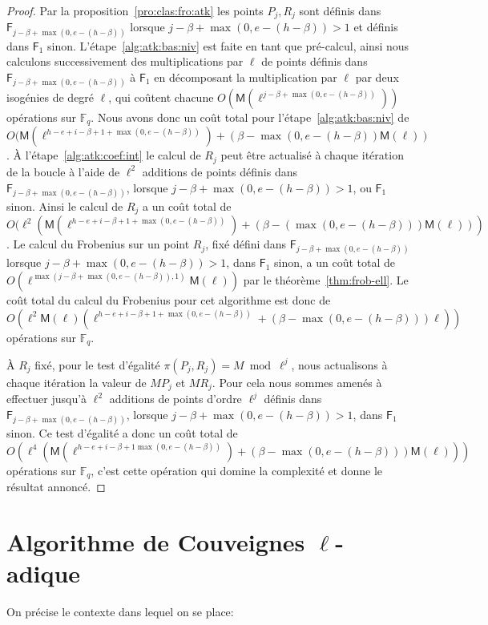 \documentclass[10pt,a4paper]{book}
\theoremstyle{plain}
\theoremstyle{definition}
\theoremstyle{definition}
\theoremstyle{definition}
\theoremstyle{definition}
\theoremstyle{definition}
\theoremstyle{remark}
\theoremstyle{remark}
\theoremstyle{definition}
\begin{document}
\begin{proof}
\sloppy
Par la proposition~\ref{pro:clas:fro:atk} les points $P_j,R_j$ sont définis
dans $\mathsf{F}_{j-\beta+\max(0,e-(h-\beta))}$ lorsque $j-\beta+\max(0,e-(h-\beta))>1$ et 
définis dans $\mathsf{F}_1$ sinon. L'étape~\ref{alg:atk:bas:niv} est faite en 
tant que pré-calcul, ainsi nous calculons successivement des multiplications par 
$\ell$ de points définis dans $\mathsf{F}_{j-\beta+\max(0,e-(h-\beta))}$ à 
$\mathsf{F}_{1}$ en décomposant la multiplication par $\ell$ par deux isogénies
de degré $\ell$, qui coûtent chacune $O(\mathsf{M}(\ell^{j-\beta+\max(0,e-
(h-\beta))}))$ opérations sur $\mathbb{F}_q$. Nous avons donc un coût total pour 
l'étape~\ref{alg:atk:bas:niv} de $O(\mathsf{M}(\ell^{h-e+i-\beta+1+\max(0,e-
(h-\beta))})+(\beta-\max(0,e-(h-\beta))\mathsf{M}(\ell))$.
\`A l'étape~\ref{alg:atk:coef:int} le calcul de $R_j$ peut être actualisé à 
chaque itération de la boucle à l'aide 
de $\ell^2$ additions de points définis dans $\mathsf{F}_{j-\beta+\max(0,e-(h-\beta))}$, 
lorsque $j-\beta+\max(0,e-(h-\beta))>1$, ou $\mathsf{F}_1$ sinon. Ainsi le calcul de $R_j$ a 
un coût total de 
$O(\ell^{2}(\mathsf{M}(\ell^{h-e+i-\beta+1+\max(0,e-(h-\beta))})+(\beta-(\max(0,e-(h-\beta)))\mathsf{M}(\ell)))$. 
Le calcul du Frobenius sur un point $R_j$, fixé défini dans 
$\mathsf{F}_{j-\beta+\max(0,e-(h-\beta))}$ lorsque $j-\beta+\max(0,e-(h-\beta))>1$, 
dans $\mathsf{F}_1$ sinon, a un coût total de $O(\ell^{\max(j-\beta+\max(0,e-(h-\beta)),1)}
\mathsf{M}(\ell))$ par le théorème~\ref{thm:frob-ell}. Le coût total du calcul du 
Frobenius pour cet algorithme est donc de 
\[O(\ell^2\mathsf{M}(\ell)(\ell^{h-e+i-\beta+1+\max(0,e-(h-\beta))}+(\beta-\max(0,e-(h-\beta)))\ell))\]
opérations sur $\mathbb{F}_q$.
\fussy

\`A $R_j$ fixé, pour le test d'égalité $\pi(P_j,R_j)= M \bmod \ell^j$, nous 
actualisons à chaque itération la valeur de $MP_j$ et $MR_j$. Pour cela nous 
sommes amenés à effectuer jusqu'à $\ell^2$ additions de points d'ordre 
$\ell^{j}$ définis dans $\mathsf{F}_{j-\beta+\max(0,e-(h-\beta))}$, lorsque 
$j-\beta+\max(0,e-(h-\beta))>1$, dans
$\mathsf{F}_1$ sinon. Ce test d'égalité a donc un coût total de 
$O(\ell^4(\mathsf{M}(\ell^{h-e+i-\beta+1\max(0,e-(h-\beta))})+(\beta-\max(0,e-(h-\beta)))\mathsf{M}(\ell)))$ 
opérations sur $\mathbb{F}_q$, c'est cette opération qui domine la complexité
et donne le résultat annoncé.
\end{proof}

\chapter{Algorithme de Couveignes $\ell$-adique}
\label{cha:alg:fin}
On précise le contexte dans lequel on se place:
\end{document}
